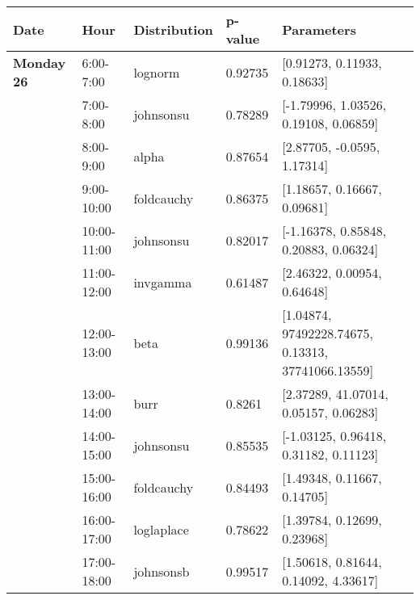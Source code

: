 \begin{longtable}[c]{llllp{5cm}}
\textbf{Date}         & \textbf{Hour} & \textbf{Distribution} & \textbf{p-value} & \textbf{Parameters}                                    \\ \hline
\endfirsthead
%
\endhead
%
\textbf{Monday 26}    & 6:00-7:00             & lognorm               & 0.92735          & {[}0.91273, 0.11933, 0.18633{]}                        \\
\textbf{}             & 7:00-8:00             & johnsonsu             & 0.78289          & {[}-1.79996, 1.03526, 0.19108, 0.06859{]}              \\
\textbf{}             & 8:00-9:00             & alpha                 & 0.87654          & {[}2.87705, -0.0595, 1.17314{]}                        \\
\textbf{}             & 9:00-10:00             & foldcauchy            & 0.86375          & {[}1.18657, 0.16667, 0.09681{]}                        \\
\textbf{}             & 10:00-11:00            & johnsonsu             & 0.82017          & {[}-1.16378, 0.85848, 0.20883, 0.06324{]}              \\
\textbf{}             & 11:00-12:00            & invgamma              & 0.61487          & {[}2.46322, 0.00954, 0.64648{]}                        \\
\textbf{}             & 12:00-13:00            & beta                  & 0.99136          & {[}1.04874, 97492228.74675, 0.13313, 37741066.13559{]} \\
\textbf{}             & 13:00-14:00            & burr                  & 0.8261           & {[}2.37289, 41.07014, 0.05157, 0.06283{]}              \\
\textbf{}             & 14:00-15:00            & johnsonsu             & 0.85535          & {[}-1.03125, 0.96418, 0.31182, 0.11123{]}              \\
\textbf{}             & 15:00-16:00            & foldcauchy            & 0.84493          & {[}1.49348, 0.11667, 0.14705{]}                        \\
\textbf{}             & 16:00-17:00            & loglaplace            & 0.78622          & {[}1.39784, 0.12699, 0.23968{]}                        \\
\textbf{}             & 17:00-18:00            & johnsonsb             & 0.99517          & {[}1.50618, 0.81644, 0.14092, 4.33617{]}               \\

\end{longtable}
